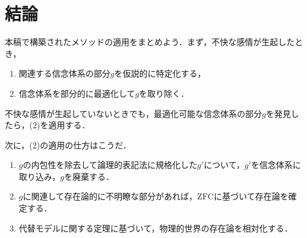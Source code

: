 \section{結論}
\label{sec:結論}

本稿で構築されたメソッドの適用をまとめよう．まず，不快な感情が生起したとき，
\begin{enumerate}[label=(\arabic*)]
    \item 関連する信念体系の部分$g$を仮説的に特定化する，
    \item 信念体系を部分的に最適化して$g$を取り除く．
\end{enumerate}
不快な感情が生起していないときでも，最適化可能な信念体系の部分$g$を発見したら，(2)を適用する．

次に，(2)の適用の仕方はこうだ．
\begin{enumerate}[label=(\alph*)]
    \item $g$の内包性を除去して論理的表記法に規格化した$g'$について，$g'$を信念体系に取り込み，$g$を廃棄する．
    \item $g$に関連して存在論的に不明瞭な部分があれば，$\mathrm{ZFC}$に基づいて存在論を確定する．
    \item 代替モデルに関する定理に基づいて，物理的世界の存在論を相対化する．
\end{enumerate}

